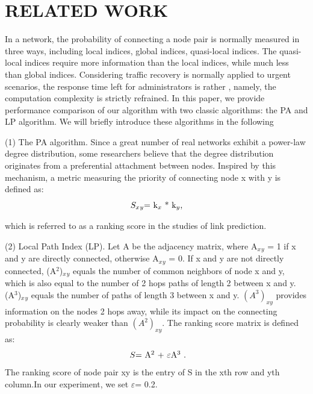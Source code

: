 \documentclass[onecolumn,preprintnumbers,amsmath,amssymb]{revtex4}
\begin{document}
\section*{RELATED WORK\protect}		
In a network, the probability of connecting a node pair is normally measured in three ways, including local indices, global indices, quasi-local indices. The quasi-local indices require more information than the local indices, while much less than global indices. 
Considering traffic recovery is normally applied to urgent scenarios, the response time left for administrators is rather , namely, the computation complexity is strictly refrained. 
In this paper, we provide performance comparison of our algorithm with two classic algorithms: the PA and LP algorithm. 
We will briefly introduce these algorithms in the following

(1) The PA algorithm\cite{WG}. 
Since a great number of real networks exhibit a power-law degree distribution, some researchers believe that the degree distribution originates from a preferential attachment between nodes. Inspired by this mechanism, a metric measuring the priority of connecting node x with y is defined as:
\begin{equation}
\centerline{
$S_x$$_y$=
k$_x$ * k$_y$,
}
\end{equation}

which is referred to as a ranking score in the studies of link prediction\cite{SV}.


(2) Local Path Index (LP). 
Let A be the adjacency matrix, where A$_x$$_y$ = 1 if x and y are directly connected, otherwise A$_x$$_y$ = 0. 
If x and y are not directly connected, (A$^2$)$_x$$_y$ equals the number of common neighbors of node x and y, which is also equal to the number of 2 hops paths of length 2 between x and y. 
(A$^3$)$_x$$_y$ equals the number of paths of length 3 between x and y. 
$(A^3)_{xy }$ provides information on the nodes 2 hops away, while its impact on the connecting probability is clearly weaker than $(A^2)_{xy }$. The ranking score matrix\cite{AC,LI} is defined as:
\begin{equation}
\centerline{
$S$=
A$^2$ + $\varepsilon$A$^3$
.}
\end{equation}
The ranking score of node pair xy is the entry of S in the xth row and yth column.In our experiment, we set 
$\varepsilon$= 0.2.
\end{document}
